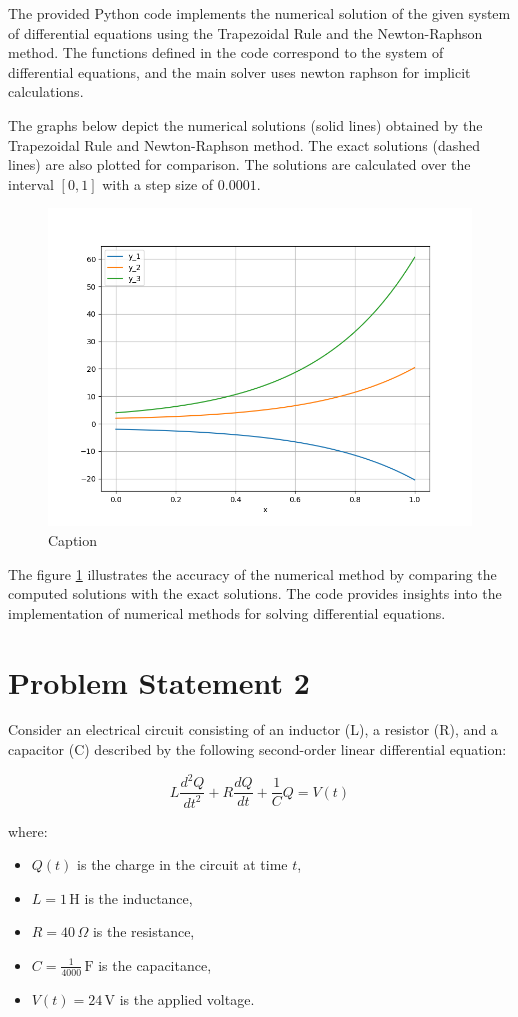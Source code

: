 \documentclass{article}
\begin{document}
The provided Python code implements the numerical solution of the given system of differential equations using the Trapezoidal Rule and the Newton-Raphson method. The functions defined in the code correspond to the system of differential equations, and the main solver uses newton raphson for implicit calculations.

The graphs below depict the numerical solutions (solid lines) obtained by the Trapezoidal Rule and Newton-Raphson method. The exact solutions (dashed lines) are also plotted for comparison. The solutions are calculated over the interval $[0, 1]$ with a step size of $0.0001$.
\begin{figure}[H]
    \centering
    \includegraphics[width = 13cm]{save.png}
    \caption{Caption}
    \label{fig:solutions}
\end{figure}
The figure \ref{fig:solutions} illustrates the accuracy of the numerical method by comparing the computed solutions with the exact solutions. The code provides insights into the implementation of numerical methods for solving differential equations.

\section*{Problem Statement 2}
Consider an electrical circuit consisting of an inductor (L), a resistor (R), and a capacitor (C) described by the following second-order linear differential equation:

\[
L\frac{d^2Q}{dt^2} + R\frac{dQ}{dt} + \frac{1}{C}Q = V(t)
\]

where:
\begin{itemize}
  \item \( Q(t) \) is the charge in the circuit at time \( t \),
  \item \( L = 1 \, \text{H} \) is the inductance,
  \item \( R = 40 \, \Omega \) is the resistance,
  \item \( C = \frac{1}{4000} \, \text{F} \) is the capacitance,
  \item \( V(t) = 24 \, \text{V} \) is the applied voltage.
\end{itemize}
\end{document}
